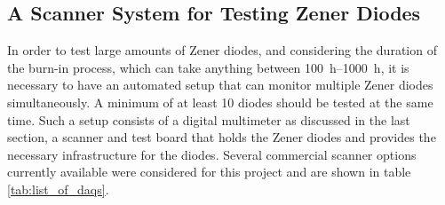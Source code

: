 \subsection{A Scanner System for Testing Zener Diodes}%
\label{sec:diode_scanner_system}
In order to test large amounts of Zener diodes, and considering the duration of the burn-in process, which can take anything between \qtyrange[range-units = single,range-phrase={~to~}]{100}{1000}{\hour}, it is necessary to have an automated setup that can monitor multiple Zener diodes simultaneously. A minimum of at least 10 diodes should be tested at the same time. Such a setup consists of a digital multimeter as discussed in the last section, a scanner and test board that holds the Zener diodes and provides the necessary infrastructure for the diodes. Several commercial scanner options currently available were considered for this project and are shown in table \ref{tab:list_of_daqs}.
